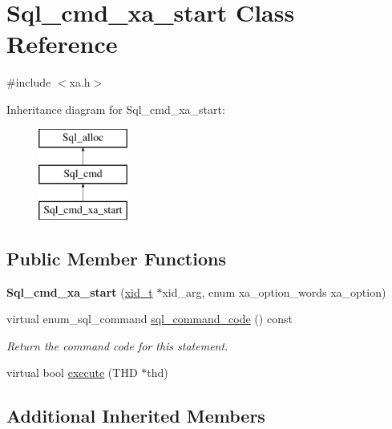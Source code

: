 \hypertarget{classSql__cmd__xa__start}{}\section{Sql\+\_\+cmd\+\_\+xa\+\_\+start Class Reference}
\label{classSql__cmd__xa__start}


{\ttfamily \#include $<$xa.\+h$>$}

Inheritance diagram for Sql\+\_\+cmd\+\_\+xa\+\_\+start\+:\begin{figure}[H]
\begin{center}
\leavevmode
\includegraphics[height=3.000000cm]{classSql__cmd__xa__start}
\end{center}
\end{figure}
\subsection*{Public Member Functions}
\begin{DoxyCompactItemize}
\item 
\mbox{\label{classSql__cmd__xa__start_a45506293d4caa80e5ad323eea1241a47}} 
{\bfseries Sql\+\_\+cmd\+\_\+xa\+\_\+start} (\mbox{\hyperlink{structxid__t}{xid\+\_\+t}} $\ast$xid\+\_\+arg, enum xa\+\_\+option\+\_\+words xa\+\_\+option)
\item 
\mbox{\label{classSql__cmd__xa__start_ab7f37c6fea822aad05e4e90bdbebf5df}} 
virtual enum\+\_\+sql\+\_\+command \mbox{\hyperlink{classSql__cmd__xa__start_ab7f37c6fea822aad05e4e90bdbebf5df}{sql\+\_\+command\+\_\+code}} () const
\begin{DoxyCompactList}\small\item\em Return the command code for this statement. \end{DoxyCompactList}\item 
virtual bool \mbox{\hyperlink{classSql__cmd__xa__start_a1aec90983e7360a72906ac004b792d4f}{execute}} (T\+HD $\ast$thd)
\end{DoxyCompactItemize}
\subsection*{Additional Inherited Members}


